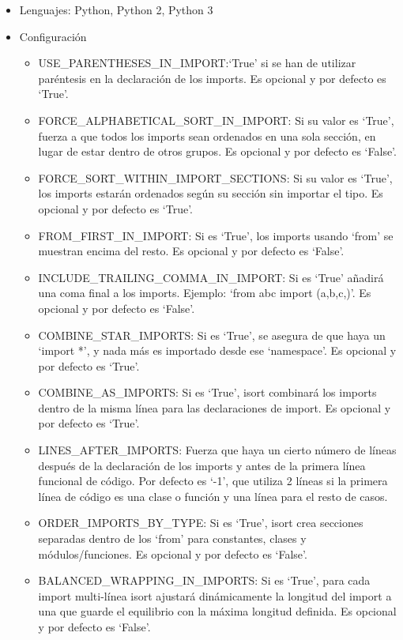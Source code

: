 \documentclass[a4paper, 12pt]{book}
\begin{document}
\begin{itemize}
  \item Lenguajes: Python, Python 2, Python 3
  \item Configuración
    \begin{itemize}
          \item USE\_PARENTHESES\_IN\_IMPORT:`True' si se han de utilizar paréntesis en la declaración de los imports. Es opcional y por defecto es `True'.
          \item FORCE\_ALPHABETICAL\_SORT\_IN\_IMPORT: Si su valor es `True', fuerza a que todos los imports sean ordenados en una sola sección, en lugar de estar dentro de otros grupos. Es opcional y por defecto es `False'.
          \item FORCE\_SORT\_WITHIN\_IMPORT\_SECTIONS: Si su valor es `True', los imports estarán ordenados según su sección sin importar el tipo. Es opcional y por defecto es `True'.
          \item FROM\_FIRST\_IN\_IMPORT: Si es `True', los imports usando `from' se muestran encima del resto. Es opcional y por defecto es `False'.
          \item INCLUDE\_TRAILING\_COMMA\_IN\_IMPORT: Si es `True' añadirá una coma final a los imports. Ejemplo: `from abc import (a,b,c,)'. Es opcional y por defecto es `False'.
          \item COMBINE\_STAR\_IMPORTS: Si es `True', se asegura de que haya un `import *', y nada más es importado desde ese `namespace'. Es opcional y por defecto es `True'.
          \item COMBINE\_AS\_IMPORTS: Si es `True', isort combinará los imports dentro de la misma línea para las declaraciones de import. Es opcional y por defecto  es `True'.
          \item LINES\_AFTER\_IMPORTS: Fuerza que haya un cierto número de líneas después de la declaración de los imports y antes de la primera línea funcional de código. Por defecto es `-1', que utiliza 2 líneas si la primera línea de código es una clase o función y una línea para el resto de casos.
          \item ORDER\_IMPORTS\_BY\_TYPE: Si es `True', isort crea secciones separadas dentro de los `from' para constantes, clases y módulos/funciones. Es opcional y por defecto es `False'.
          \item BALANCED\_WRAPPING\_IN\_IMPORTS: Si es `True', para cada import multi-línea isort ajustará dinámicamente la longitud del import a una que guarde el equilibrio con la máxima longitud definida. Es opcional y por defecto es `False'.

\end{itemize}
\end{itemize}
\end{document}
